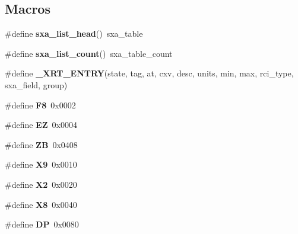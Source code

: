 \subsection*{Macros}
\begin{DoxyCompactItemize}
\item 
\hypertarget{group___s_x_a_ga27795359331f2e44d8d40c1b9163a674}{\#define {\bfseries sxa\-\_\-list\-\_\-head}()~sxa\-\_\-table}\label{group___s_x_a_ga27795359331f2e44d8d40c1b9163a674}

\item 
\hypertarget{group___s_x_a_gab0d9a6292749d033909b792227bd85ad}{\#define {\bfseries sxa\-\_\-list\-\_\-count}()~sxa\-\_\-table\-\_\-count}\label{group___s_x_a_gab0d9a6292749d033909b792227bd85ad}

\item 
\#define {\bfseries \-\_\-\-X\-R\-T\-\_\-\-E\-N\-T\-R\-Y}(state, tag, at, cxv, desc, units, min, max, rci\-\_\-type, sxa\-\_\-field, group)
\item 
\hypertarget{group___s_x_a_gaebf0bdb7cd47b4d4c612c2cadee1a743}{\#define {\bfseries F8}~0x0002}\label{group___s_x_a_gaebf0bdb7cd47b4d4c612c2cadee1a743}

\item 
\hypertarget{group___s_x_a_gaa58c02315d6d183636fa06f91600855c}{\#define {\bfseries E\-Z}~0x0004}\label{group___s_x_a_gaa58c02315d6d183636fa06f91600855c}

\item 
\hypertarget{group___s_x_a_ga7c41685fef06e2a89abc69a7edfb4500}{\#define {\bfseries Z\-B}~0x0408}\label{group___s_x_a_ga7c41685fef06e2a89abc69a7edfb4500}

\item 
\hypertarget{group___s_x_a_ga415a5793bb5269705fcb36b6d3800952}{\#define {\bfseries X9}~0x0010}\label{group___s_x_a_ga415a5793bb5269705fcb36b6d3800952}

\item 
\hypertarget{group___s_x_a_ga79ae03a0214cb30e57b9e8835f2a0019}{\#define {\bfseries X2}~0x0020}\label{group___s_x_a_ga79ae03a0214cb30e57b9e8835f2a0019}

\item 
\hypertarget{group___s_x_a_ga97d09b56987fc327100f41788e1b26db}{\#define {\bfseries X8}~0x0040}\label{group___s_x_a_ga97d09b56987fc327100f41788e1b26db}

\item 
\hypertarget{group___s_x_a_gab3383e72bb58d5e6faf0501cd117acfa}{\#define {\bfseries D\-P}~0x0080}\label{group___s_x_a_gab3383e72bb58d5e6faf0501cd117acfa}


\end{DoxyCompactItemize}
